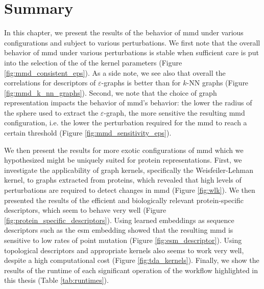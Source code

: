 \section{Summary}

In this chapter, we present the results of the behavior of \acrshort{mmd} under various
configurations and subject to various perturbations. We first note that the
overall behavior of \acrshort{mmd} under various perturbations is stable when sufficient
care is put into the selection of the of the kernel parameters (Figure \ref{fig:mmd_consistent_eps}). As a side note,
we see also that overall the correlations for descriptors of
$\varepsilon$-graphs is better than for $k$-NN graphs (Figure \ref{fig:mmd_k_nn_graphs}). Second, we note that the
choice of graph representation impacts the behavior of \acrshort{mmd}'s behavior: the
lower the radius of the sphere used to extract the $\varepsilon$-graph, the more
sensitive the resulting \acrshort{mmd} configuration, i.e. the lower the perturbation
required for the \acrshort{mmd} to reach a certain threshold (Figure
\ref{fig:mmd_sensitivity_eps}).

We then present the results for more exotic configurations of \acrshort{mmd} which we
hypothesized might be uniquely suited for protein representations. First, we
investigate the applicability of graph kernels, specifically the
Weisfeiler-Lehman kernel, to graphs extracted from proteins, which revealed that
high levels of perturbations are required to detect changes in \acrshort{mmd} (Figure
\ref{fig:wlk}). We then presented the results of the efficient and biologically
relevant protein-specific descriptors, which seem to behave very well (Figure
\ref{fig:protein_specific_descriptors}). Using learned embeddings as sequence
descriptors such as the \acrshort{esm} embedding showed that the resulting \acrshort{mmd} is sensitive
to low rates of point mutation (Figure \ref{fig:esm_descriptor}). Using
topological descriptors and appropriate kernels also seems to work very well, despite
a high computational cost (Figure \ref{fig:tda_kernels}). Finally, we show the
results of the runtime of each significant operation of the workflow highlighted
in this thesis (Table \ref{tab:runtimes}).

